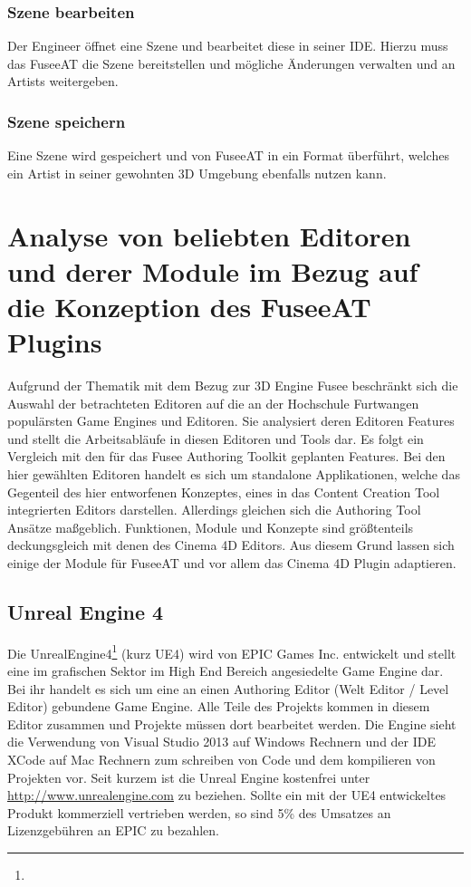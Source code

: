 \documentclass[pagesize, paper=a4, fontsize=12pt, titlepage=true, headings=small, headnosepline, abstractoff, liststotoc, nochapterprefix, plainheadsepline, twoside]{scrreprt}
\begin{document}
\subsubsection{Szene bearbeiten}
Der Engineer öffnet eine Szene und bearbeitet diese in seiner IDE. Hierzu muss das FuseeAT die Szene bereitstellen und mögliche Änderungen verwalten und an Artists weitergeben.

\subsubsection{Szene speichern}
Eine Szene wird gespeichert und von FuseeAT in ein Format überführt, welches ein Artist in seiner gewohnten 3D Umgebung ebenfalls nutzen kann.

\section{Analyse von beliebten Editoren und derer Module im Bezug auf die Konzeption des FuseeAT Plugins}
Aufgrund der Thematik mit dem Bezug zur 3D Engine Fusee beschränkt sich die Auswahl der betrachteten Editoren auf die an der Hochschule Furtwangen populärsten Game Engines und Editoren. Sie analysiert deren Editoren Features und stellt die Arbeitsabläufe in diesen Editoren und Tools dar. Es folgt ein Vergleich mit den für das Fusee Authoring Toolkit geplanten Features. Bei den hier gewählten Editoren handelt es sich um standalone Applikationen, welche das Gegenteil des hier entworfenen Konzeptes, eines in das Content Creation Tool integrierten Editors darstellen. Allerdings gleichen sich die Authoring Tool Ansätze maßgeblich. Funktionen, Module und Konzepte sind größtenteils deckungsgleich mit denen des Cinema 4D Editors. Aus diesem Grund lassen sich einige der Module für FuseeAT und vor allem das Cinema 4D Plugin adaptieren.

\subsection{Unreal Engine 4}
Die UnrealEngine4\footnote{} (kurz UE4) wird von EPIC Games Inc. entwickelt und stellt eine im grafischen Sektor im High End Bereich angesiedelte Game Engine dar. Bei ihr handelt es sich um eine an einen Authoring Editor (Welt Editor / Level Editor) gebundene Game Engine. Alle Teile des Projekts kommen in diesem Editor zusammen und Projekte müssen dort bearbeitet werden. Die Engine sieht die Verwendung von Visual Studio 2013 auf Windows Rechnern und der IDE XCode auf Mac Rechnern zum schreiben von Code und dem kompilieren von Projekten vor. Seit kurzem ist die Unreal Engine kostenfrei unter \url{http://www.unrealengine.com} zu beziehen. Sollte ein mit der UE4 entwickeltes Produkt kommerziell vertrieben werden, so sind 5\% des Umsatzes an Lizenzgebühren an EPIC zu bezahlen.
\end{document}

